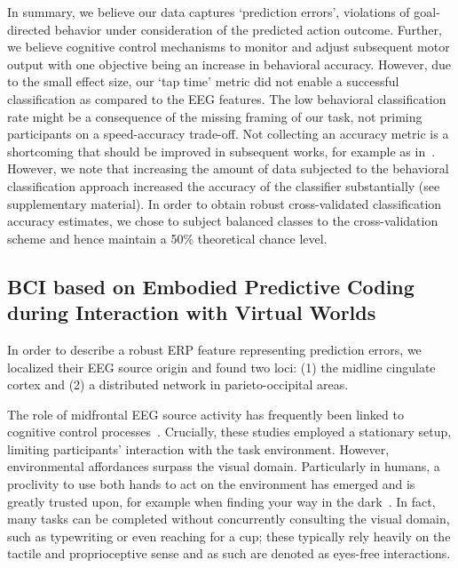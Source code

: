 In summary, we believe our data captures `prediction errors', violations of goal-directed behavior under consideration of the predicted action outcome. Further, we believe cognitive control mechanisms to monitor and adjust subsequent motor output with one objective being an increase in behavioral accuracy. However, due to the small effect size, our `tap time' metric did not enable a successful classification as compared to the EEG features. The low behavioral classification rate might be a consequence of the missing framing of our task, not priming participants on a speed-accuracy trade-off. Not collecting an accuracy metric is a shortcoming that should be improved in subsequent works, for example as in~\cite{Purcell2016-li}. However, we note that increasing the amount of data subjected to the behavioral classification approach increased the accuracy of the classifier substantially (see supplementary material). In order to obtain robust cross-validated classification accuracy estimates, we chose to subject balanced classes to the cross-validation scheme and hence maintain a 50\% theoretical chance level.

\subsection{BCI based on Embodied Predictive Coding during Interaction with Virtual Worlds}

In order to describe a robust ERP feature representing prediction errors, we localized their EEG source origin and found two loci: (1) the midline cingulate cortex and (2) a distributed network in parieto-occipital areas. 

The role of midfrontal EEG source activity has frequently been linked to cognitive control processes~\cite{Ridderinkhof2004-rz, Cavanagh2014-mm, Cooper2019-im}. Crucially, these studies employed a stationary setup, limiting participants' interaction with the task environment. However, environmental affordances surpass the visual domain. Particularly in humans, a proclivity to use both hands to act on the environment has emerged and is greatly trusted upon, for example when finding your way in the dark~\cite{Gehrke2018-jm, Gehrke2021-ml, Miyakoshi2021-ni}. In fact, many tasks can be completed without concurrently consulting the visual domain, such as typewriting or even reaching for a cup; these typically rely heavily on the tactile and proprioceptive sense and as such are denoted as eyes-free interactions.

